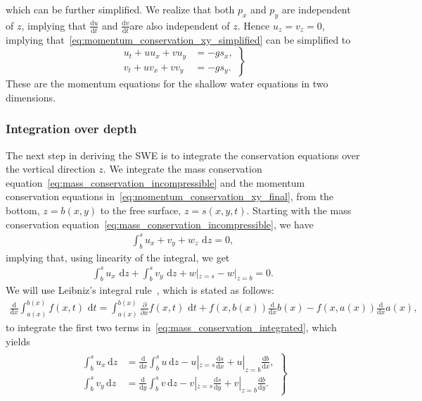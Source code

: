which can be further simplified.
We realize that both $p_x$ and $p_y$ are independent of $z$, implying that $\frac{\text{d}u}{\text{d}t} $ and $\frac{\text{d}v}{\text{d}t} $are also independent of $z$.
Hence $u_z = v_z = 0$, implying that~\eqref{eq:momentum_conservation_xy_simplified} can be simplified to
\begin{equation}\label{eq:momentum_conservation_xy_final}
    \left.
    \begin{aligned}
        u_t + u u_x + v u_y &= -g s_x,  \\
        v_t + u v_x + v v_y &= -g s_y.
    \end{aligned}
    \right\}
\end{equation}
These are the momentum equations for the shallow water equations in two dimensions.

\subsubsection*{Integration over depth}
The next step in deriving the SWE is to integrate the conservation equations over the vertical direction $z$.
We integrate the mass conservation equation~\eqref{eq:mass_conservation_incompressible} and the momentum conservation equations in~\eqref{eq:momentum_conservation_xy_final}, from the bottom, $z = b(x,y)$ to the free surface, $z = s(x,y,t)$.
Starting with the mass conservation equation~\eqref{eq:mass_conservation_incompressible}, we have
\begin{align*}
    \int_{b}^{s} u_x + v_y + w_z \text{ d} z = 0,
\end{align*}
implying that, using linearity of the integral, we get
\begin{align}\label{eq:mass_conservation_integrated}
    \int_{b}^{s} u_x \text{ d} z + \int_{b}^{s} v_y \text{ d} z  + w|_{z = s} - w|_{z = b} = 0.
\end{align}
We will use Leibniz's integral rule~\cite{Leibniz}, which is stated as follows:
\begin{align}\label{eq:leibniz_rule}
    \frac{\text{d}}{\text{d} x} \int_{a(x)}^{b(x)} f(x,t) \text{ d} t
    = \int_{a(x)}^{b(x)} \frac{\partial }{\partial x} f(x, t) \text{ d} t + f(x, b(x)) \frac{\text{d}}{\text{d} x} b(x) - f(x, a(x)) \frac{\text{d}}{\text{d} x} a(x),
\end{align}
to integrate the first two terms in~\eqref{eq:mass_conservation_integrated}, which yields
\begin{align}\label{eq:leibniz_rule_applied}
    \begin{gathered}
        \left.
        \begin{aligned}
        \int_{b}^{s} u_x \, \text{d} z &=  \frac{\text{d}}{\text{d} x}  \int_{b}^{s} u \, \text{d} z  - u|_{z = s} \frac{\text{d} s}{\text{d} x} + u|_{z = b} \frac{\text{d} b}{\text{d} x}, \\
        \int_{b}^{s} v_y \, \text{d} z &=  \frac{\text{d}}{\text{d} y}  \int_{b}^{s} v \, \text{d} z  - v|_{z = s} \frac{\text{d} s}{\text{d} y} + v|_{z = b} \frac{\text{d} b}{\text{d} y}.
        \end{aligned}
        \right\}
    \end{gathered}
\end{align}
